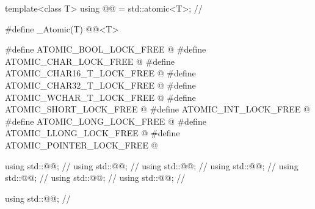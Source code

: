 \begin{codeblock}
template<class T>
  using @@ = std::atomic<T>;        // \expos

#define _Atomic(T) @@<T>

#define ATOMIC_BOOL_LOCK_FREE @\seebelow@
#define ATOMIC_CHAR_LOCK_FREE @\seebelow@
#define ATOMIC_CHAR16_T_LOCK_FREE @\seebelow@
#define ATOMIC_CHAR32_T_LOCK_FREE @\seebelow@
#define ATOMIC_WCHAR_T_LOCK_FREE @\seebelow@
#define ATOMIC_SHORT_LOCK_FREE @\seebelow@
#define ATOMIC_INT_LOCK_FREE @\seebelow@
#define ATOMIC_LONG_LOCK_FREE @\seebelow@
#define ATOMIC_LLONG_LOCK_FREE @\seebelow@
#define ATOMIC_POINTER_LOCK_FREE @\seebelow@

using std::@@;             // \seebelow
using std::@@;     // \seebelow
using std::@@;     // \seebelow
using std::@@;     // \seebelow
using std::@@;     // \seebelow
using std::@@;     // \seebelow
using std::@@;     // \seebelow

using std::@@;              // \seebelow


\end{codeblock}
